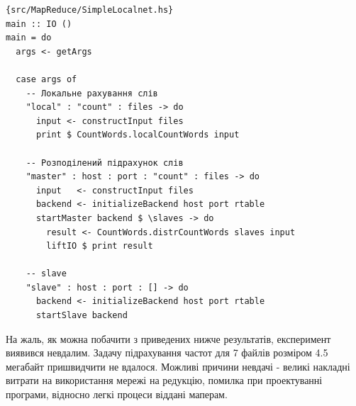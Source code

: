 \documentclass[12pt]{article}
\begin{document}
\begin{lstlisting}{src/MapReduce/SimpleLocalnet.hs}
main :: IO ()
main = do
  args <- getArgs

  case args of
    -- Локальне рахування слів
    "local" : "count" : files -> do
      input <- constructInput files
      print $ CountWords.localCountWords input

    -- Розподілений підрахунок слів
    "master" : host : port : "count" : files -> do
      input   <- constructInput files
      backend <- initializeBackend host port rtable
      startMaster backend $ \slaves -> do
        result <- CountWords.distrCountWords slaves input
        liftIO $ print result

    -- slave
    "slave" : host : port : [] -> do
      backend <- initializeBackend host port rtable
      startSlave backend
\end{lstlisting}

На жаль, як можна побачити з приведених нижче результатів, експеримент виявився невдалим.
Задачу підрахування частот для 7 файлів розміром 4.5 мегабайт пришвидчити не вдалося.
Можливі причини невдачі - великі накладні витрати на використання мережі на редукцію, 
помилка при проектуванні програми, відносно легкі процеси віддані маперам.
\end{document}
